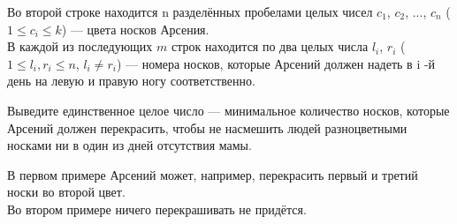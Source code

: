 \begin{problem}
Во второй строке находится n разделённых пробелами целых чисел $c_1$, $c_2$, ..., $c_n$ ($1 \le c_i \le k$) — цвета носков Арсения.\\

В каждой из последующих $m$ строк находится по два целых числа $l_i$, $r_i$ ($1 \le l_i, r_i \le n$, $l_i \neq r_i$) — номера носков, которые Арсений должен надеть в i -й день на левую и правую ногу соответственно.

\OutputFile

Выведите единственное целое число — минимальное количество носков, которые Арсений должен перекрасить, чтобы не насмешить людей разноцветными носками ни в один из дней отсутствия мамы.

\Examples

\begin{example}
%
%
\end{example}

\Explanation

В первом примере Арсений может, например, перекрасить первый и третий носки во второй цвет.\\

Во втором примере ничего перекрашивать не придётся.

\end{problem}
